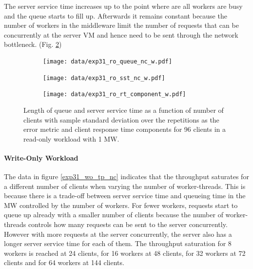 \documentclass[report.tex]{subfiles}
\begin{document}
The server service time increases up to the point where are all workers are busy and the queue starts to fill up. Afterwards it remains constant because the number of workers in the middleware limit the number of requests that can be concurrently at the server VM and hence need to be sent through the network bottleneck. (Fig. \ref{exp31_ro_sst})


\begin{figure}[H]
	\begin{subfigure}[b]{.33\linewidth}
		\centering
		\texttt{[image: data/exp31\_ro\_queue\_nc\_w.pdf]}
		\caption{}\label{exp31_ro_q}
	\end{subfigure}\hfill
	\begin{subfigure}[b]{.33\linewidth}
		\centering
		\texttt{[image: data/exp31\_ro\_sst\_nc\_w.pdf]}
		\caption{}\label{exp31_ro_sst}
	\end{subfigure}\hfill
	\begin{subfigure}[b]{.33\linewidth}
		\centering
		\texttt{[image: data/exp31\_ro\_rt\_component\_w.pdf]}
		\caption{}\label{exp31_ro_rtcomp}
	\end{subfigure}
	\caption{Length of queue and server service time as a function of number of clients with sample standard deviation over the repetitions as the error metric and client response time components for 96 clients in a read-only workload with 1 MW.}
\end{figure}


\paragraph{Write-Only Workload}


The data in figure \ref{exp31_wo_tp_nc} indicates that the throughput saturates for a different number of clients when varying the number of worker-threads. This is because there is a trade-off between server service time and queueing time in the MW controlled by the number of workers. For fewer workers, requests start to queue up already with a smaller number of clients because the number of worker-threads controls how many requests can be sent to the server concurrently. However with more requests at the server concurrently, the server also has a longer server service time for each of them.
The throughput saturation for 8 workers is reached at 24 clients, for 16 workers at 48 clients, for 32 workers at 72 clients and for 64 workers at 144 clients.
\end{document}

